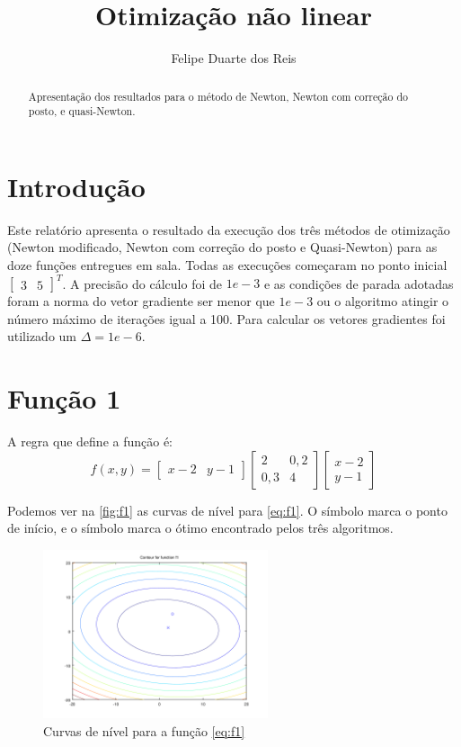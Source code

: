 \documentclass[12pt]{article}
\title{Otimização não linear}
\author{Felipe Duarte dos Reis}
\begin{document}
\maketitle

\begin{abstract}
Apresentação dos resultados para o método de Newton, Newton com correção do posto, e quasi-Newton.
\end{abstract}

\section{Introdução}
Este relatório apresenta o resultado da execução dos três métodos de otimização (Newton modificado, Newton com correção do posto e Quasi-Newton) para as 
doze funções entregues em sala. Todas as execuções começaram no ponto inicial $ \begin{bmatrix} 3 & 5 \end{bmatrix}^T $. A precisão do cálculo foi de $1e-3$ 
e as condições de parada adotadas foram a norma do vetor gradiente ser menor que $1e-3$ ou o algoritmo atingir o número máximo de iterações igual a 100. 
Para calcular os vetores gradientes foi utilizado um $\Delta = 1e-6$.

\section{Função 1}
A regra que define a função é:
\begin{equation}
\label{eq:f1}
f(x, y) = 
	   \begin{bmatrix}
            x - 2 & y - 1
           \end{bmatrix}            
           \begin{bmatrix}
	   2 	& 0,2 \\
	   0,3	& 4 
           \end{bmatrix} 
           \begin{bmatrix}
	   x - 2 \\
	   y - 1
           \end{bmatrix}
\end{equation}

Podemos ver na \autoref{fig:f1} as curvas de nível para \autoref{eq:f1}. O símbolo \textit{\textopenbullet} marca o ponto de início,
e o símbolo \textit{\texttimes} marca o ótimo encontrado pelos três algoritmos.

\begin{figure}[H]
  \centering
  \includegraphics[width=250px]{../matlab/images/f1_contour}
  \caption{Curvas de nível para a função \autoref{eq:f1}}
  \label{fig:f1}
\end{figure}
\end{document}
